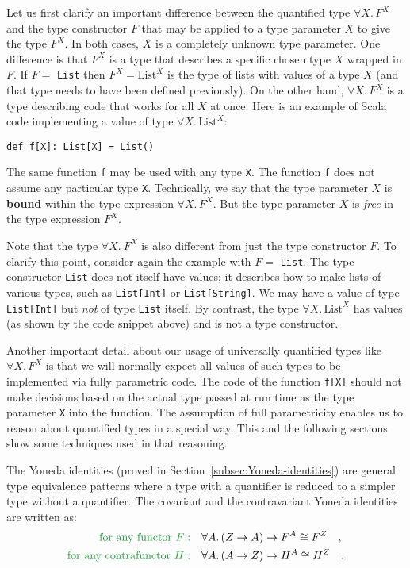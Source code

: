 Let us first clarify an important difference between the quantified
type $\forall X.\,F^{X}$ and the type constructor $F$ that may be
applied to a type parameter $X$ to give the type $F^{X}$. In both
cases, $X$ is a completely unknown type parameter. One difference
is that $F^{X}$ is a type that describes a specific chosen type $X$
wrapped in $F$. If $F=$ \lstinline!List! then $F^{X}=\text{List}^{X}$
is the type of lists with values of a type $X$ (and that type needs
to have been defined previously). On the other hand, $\forall X.\,F^{X}$
is a type describing code that works for all $X$ at once. Here is
an example of Scala code implementing a value of type $\forall X.\,\text{List}^{X}$:
\begin{lstlisting}
def f[X]: List[X] = List()
\end{lstlisting}
The same function \lstinline!f! may be used with any type \lstinline!X!.
The function \lstinline!f! does not assume any particular type \lstinline!X!.
Technically, we say that the type parameter $X$ is \textbf{bound}
within the type expression $\forall X.\,F^{X}$. But the type parameter
$X$ is \emph{free} in the type expression $F^{X}$.

Note that the type $\forall X.~F^{X}$ is also different from just
the type constructor $F$. To clarify this point, consider again the
example with $F=$ \lstinline!List!. The type constructor \lstinline!List!
does not itself have values; it describes how to make lists of various
types, such as \lstinline!List[Int]! or \lstinline!List[String]!.
We may have a value of type \lstinline!List[Int]! but \emph{not}
of type \lstinline!List! itself. By contrast, the type $\forall X.\,\text{List}^{X}$
has values (as shown by the code snippet above) and is not a type
constructor.

Another important detail about our usage of universally quantified
types like $\forall X.\,F^{X}$ is that we will normally expect all
values of such types to be implemented via fully parametric code.
The code of the function \lstinline!f[X]! should not make decisions
based on the actual type passed at run time as the type parameter
\lstinline!X! into the function. The assumption of full parametricity
enables us to reason about quantified types in a special way. This
and the following sections show some techniques used in that reasoning.

The Yoneda identities (proved in Section~\ref{subsec:Yoneda-identities})
are general type equivalence patterns where a type with a quantifier
is reduced to a simpler type without a quantifier. The covariant and
the contravariant Yoneda identities are written as:
\begin{align*}
{\color{greenunder}\text{for any functor }F:}\quad & \forall A.\,(Z\rightarrow A)\rightarrow F^{A}\cong F^{Z}\quad,\\
{\color{greenunder}\text{for any contrafunctor }H:}\quad & \forall A.\,(A\rightarrow Z)\rightarrow H^{A}\cong H^{Z}\quad.
\end{align*}

